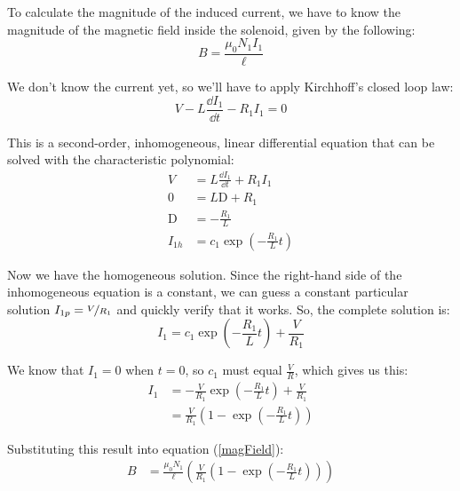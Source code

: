\documentclass{article}
\begin{document}
To calculate the magnitude of the induced current, we have to know the magnitude of the magnetic field inside the solenoid, given by the following:
\begin{equation}\label{magField}
B = \frac{\mu_0N_1I_1}{\ell}
\end{equation}

We don't know the current yet, so we'll have to apply Kirchhoff's closed loop law:
\[V - L\frac{\dd I_1}{\dd t} - R_1I_1 = 0\]

This is a second-order, inhomogeneous, linear differential equation that can be solved with the characteristic polynomial:
\begin{equation*}
\begin{aligned}
V &= L\frac{\dd I_1}{\dd t} + R_1I_1\\
0 &= L\mathrm{D} + R_1 \\
\mathrm{D} &= -\frac{R_1}{L} \\
I_{1h} &= c_1\exp\left(-\frac{R_1}{L}t\right)
\end{aligned}
\end{equation*}

Now we have the homogeneous solution. Since the right-hand side of the inhomogeneous equation is a constant, we can guess a constant particular solution $I_{1p} = \nicefrac{V}{R_1}$ and quickly verify that it works. So, the complete solution is:
\[I_1 = c_1\exp\left(-\frac{R_1}{L}t\right) + \frac{V}{R_1}\]

We know that $I_1 = 0$ when $t = 0$, so $c_1$ must equal $\frac{V}{R}$, which gives us this:
\begin{equation*}
\begin{aligned}
I_1 &= -\frac{V}{R_1}\exp\left(-\frac{R_1}{L}t\right) + \frac{V}{R_1} \\
&= \frac{V}{R_1}\left(1-\exp\left(-\frac{R_1}{L}t\right)\right)
\end{aligned}
\end{equation*}

Substituting this result into equation (\ref{magField}):
\begin{equation*}
\begin{aligned}
B &= \frac{\mu_0N_1}{\ell}\left(\frac{V}{R_1}\left(1-\exp\left(-\frac{R_1}{L}t\right)\right)\right)
\end{aligned}
\end{equation*}
\end{document}
